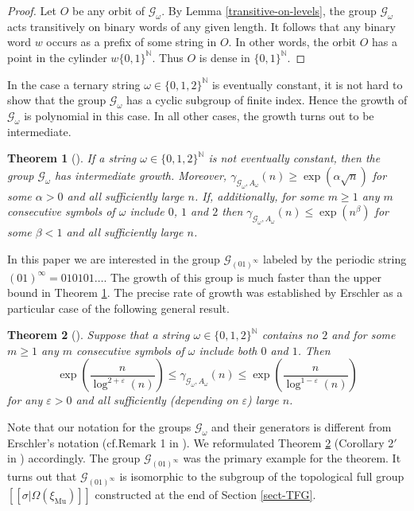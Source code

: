 \documentclass[12pt]{article}
\newtheorem{theorem}{Theorem}[section]
\theoremstyle{definition}
\def\bN{\mathbb{N}}
\def\cG{\mathcal{G}}
\def\eps{\varepsilon}
\def\om{\omega}
\def\si{\sigma}
\def\xiGE{\xi_{\mathrm{Mu}}}
\begin{document}
\begin{proof}
Let $O$ be any orbit of $\cG_\om$.  By Lemma \ref{transitive-on-levels}, 
the group $\cG_\om$ acts transitively on binary words of any given length.  
It follows that any binary word $w$ occurs as a prefix of some string in 
$O$.  In other words, the orbit $O$ has a point in the cylinder 
$w\{0,1\}^{\bN}$.  Thus $O$ is dense in $\{0,1\}^{\bN}$.
\end{proof}

In the case a ternary string $\om\in\{0,1,2\}^{\bN}$ is eventually 
constant, it is not hard to show that the group $\cG_\om$ has a cyclic 
subgroup of finite index.  Hence the growth of $\cG_\om$ is polynomial in 
this case.  In all other cases, the growth turns out to be intermediate.

\begin{theorem}[\cite{Grig84}]\label{Gri-growth}
If a string $\om\in\{0,1,2\}^{\bN}$ is not eventually constant, then the 
group $\cG_\om$ has intermediate growth.  Moreover,
$\gamma_{\cG_\om,A_\om}(n)\ge\exp(\alpha\sqrt{n})$ for some $\alpha>0$ and 
all sufficiently large $n$.  If, additionally, for some $m\ge1$ any $m$ 
consecutive symbols of $\om$ include $0$, $1$ and $2$ then 
$\gamma_{\cG_\om,A_\om}(n)\le\exp(n^\beta)$ for some $\beta<1$ and all 
sufficiently large $n$.
\end{theorem}

In this paper we are interested in the group $\cG_{(01)^\infty}$ labeled by 
the periodic string $(01)^\infty=010101\ldots$.  The growth of this group 
is much faster than the upper bound in Theorem \ref{Gri-growth}.  The 
precise rate of growth was established by Erschler \cite{Erschler04} as a 
particular case of the following general result.

\begin{theorem}[\cite{Erschler04}]\label{GE-growth}
Suppose that a string $\om\in\{0,1,2\}^{\bN}$ contains no $2$ and for 
some $m\ge1$ any $m$ consecutive symbols of $\om$ include both $0$ and 
$1$.  Then
\[
\exp\left(\frac{n}{\log^{2+\eps}(n)}\right)\le \gamma_{\cG_\om,A_\om}(n)\le
\exp\left(\frac{n}{\log^{1-\eps}(n)}\right)
\]
for any $\eps>0$ and all sufficiently (depending on $\eps$) large $n$.
\end{theorem}

Note that our notation for the groups $\cG_\om$ and their generators is 
different from Erschler's notation (cf.\@ Remark 1 in \cite{Erschler04}).  
We reformulated Theorem \ref{GE-growth} (Corollary 2$'$ in 
\cite{Erschler04}) accordingly.  The group $\cG_{(01)^\infty}$ was the 
primary example for the theorem.  It turns out that $\cG_{(01)^\infty}$ is 
isomorphic to the subgroup of the topological full group 
$[[\si|\Omega(\xiGE)]]$ constructed at the end of Section \ref{sect-TFG}.
\end{document}
